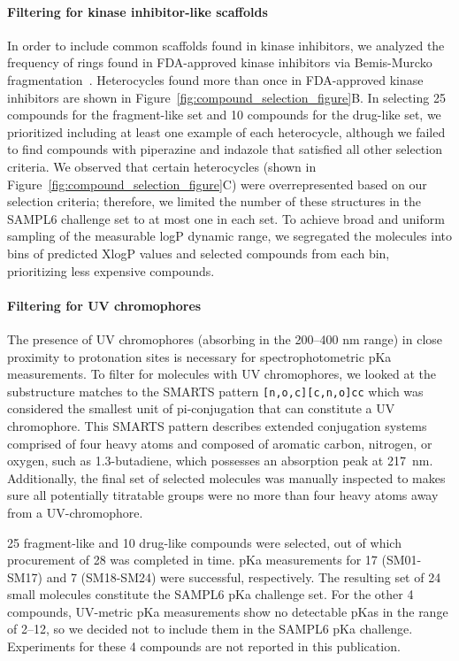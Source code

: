 \documentclass[9pt,lineno]{elife}
\begin{document}
\paragraph{Filtering for kinase inhibitor-like scaffolds}

In order to include common scaffolds found in kinase inhibitors, we analyzed the frequency of rings found in FDA-approved kinase inhibitors via Bemis-Murcko fragmentation~\citep{bemis_properties_1996, oemedchemtk_openeye_2017}. 
Heterocycles found more than once in FDA-approved kinase inhibitors are shown in Figure~\ref{fig:compound_selection_figure}B. 
In selecting 25 compounds for the fragment-like set and 10 compounds for the drug-like set, we prioritized including at least one example of each heterocycle, although we failed to find compounds with piperazine and indazole that satisfied all other selection criteria. 
We observed that certain heterocycles (shown in Figure~\ref{fig:compound_selection_figure}C) were overrepresented based on our selection criteria; therefore, we limited the number of these structures in the SAMPL6 challenge set to at most one in each set.
To achieve broad and uniform sampling of the measurable logP dynamic range, we segregated the molecules into bins of predicted XlogP values and selected compounds from each bin, prioritizing less expensive compounds. 

\paragraph{Filtering for UV chromophores}

The presence of UV chromophores (absorbing in the 200--400 nm range) in close proximity to protonation sites is necessary for spectrophotometric pKa measurements. 
To filter for molecules with UV chromophores, we looked at the substructure matches to the SMARTS pattern \texttt{[n,o,c][c,n,o]cc} which was considered the smallest unit of pi-conjugation that can constitute a UV chromophore. 
This SMARTS pattern describes extended conjugation systems comprised of four heavy atoms and composed of aromatic carbon, nitrogen, or oxygen, such as 1.3-butadiene, which possesses an absorption peak at 217~nm. 
Additionally, the final set of selected molecules was manually inspected to makes sure all potentially titratable groups were no more than four heavy atoms away from a UV-chromophore.

25 fragment-like and 10 drug-like compounds were selected, out of which procurement of 28 was completed in time. pKa measurements for 17 (SM01-SM17) and 7 (SM18-SM24) were successful, respectively. The resulting set of 24 small molecules constitute the SAMPL6 pKa challenge set.
For the other 4 compounds, UV-metric pKa measurements show no detectable pKas in the range of 2--12, so we decided not to include them in the SAMPL6 pKa challenge. Experiments for these 4 compounds are not reported in this publication. 
\end{document}
